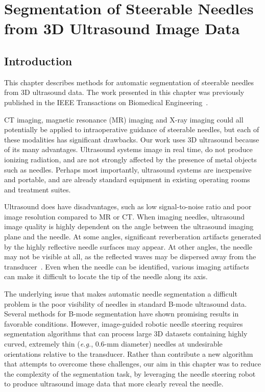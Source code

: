 \chapter[Segmentation from 3D Ultrasound]{Segmentation of Steerable Needles from 3D Ultrasound Image Data}

\section{Introduction}
This chapter describes methods for automatic segmentation of steerable needles from 3D ultrasound data. The work presented in this chapter was previously published in the IEEE Transactions on Biomedical Engineering~\cite{Adebar2014}.

CT imaging, magnetic resonance (MR) imaging and X-ray imaging could all potentially be applied to intraoperative guidance of steerable needles, but each of these modalities has significant drawbacks. Our work uses 3D ultrasound because of its many advantages. Ultrasound systems image in real time, do not produce ionizing radiation, and are not strongly affected by the presence of metal objects such as needles. Perhaps most importantly, ultrasound systems are inexpensive and portable, and are already standard equipment in existing operating rooms and treatment suites.  

Ultrasound does have disadvantages, such as low signal-to-noise ratio and poor image resolution compared to MR or CT. When imaging needles, ultrasound image quality is highly dependent on the angle between the ultrasound imaging plane and the needle. At some angles, significant reverberation artifacts generated by the highly reflective needle surfaces may appear. At other angles, the needle may not be visible at all, as the reflected waves may be dispersed away from the transducer~\cite{Chung2004}. Even when the needle can be identified, various imaging artifacts can make it difficult to locate the tip of the needle along its axis. 

The underlying issue that makes automatic needle segmentation a difficult problem is the poor visibility of needles in standard B-mode ultrasound data. Several methods for B-mode segmentation have shown promising results in favorable conditions. However, image-guided robotic needle steering requires segmentation algorithms that can process large 3D datasets containing highly curved, extremely thin (\textit{e.g.}, 0.6-mm diameter) needles at undesirable orientations relative to the transducer. Rather than contribute a new algorithm that attempts to overcome these challenges, our aim in this chapter was to reduce the complexity of the segmentation task, by leveraging the needle steering robot to produce ultrasound image data that more clearly reveal the needle.

